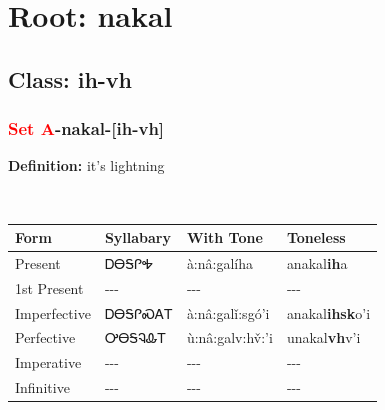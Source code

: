 \needspace{4in}
\section*{Root: nakal}
\nopagebreak
{}
\needspace{3in}
\subsection*{Class: ih-vh}
\nopagebreak
\needspace{2in}
\subsubsection*{\textcolor{Red}{Set A}{-}\textbf{nakal}{-}[ih-vh]}
\nopagebreak
\textbf{Definition: } it{\textquoteright}s lightning
\\[0.5em]
\begin{tabularx}{\textwidth}{l X X X}%
\toprule%
\textbf{Form}&\textbf{Syllabary}&\textbf{With Tone}&\textbf{Toneless}\\%
\midrule%
Present&ᎠᎾᎦᎵᎭ&à:nâ:galíha&anakal\textbf{ih}a\\%
1st Present&{-}{-}{-}&{-}{-}{-}&{-}{-}{-}\\%
Imperfective&ᎠᎾᎦᎵᏍᎪᎢ&à:nâ:galǐ:sgó’i&anakal\textbf{ihsk}o'i\\%
Perfective&ᎤᎾᎦᎸᎲᎢ&ù:nâ:galv:hv̌:’i&unakal\textbf{vh}v'i\\%
Imperative&{-}{-}{-}&{-}{-}{-}&{-}{-}{-}\\%
Infinitive&{-}{-}{-}&{-}{-}{-}&{-}{-}{-}\\%
\bottomrule%
\end{tabularx}
\\[1em]